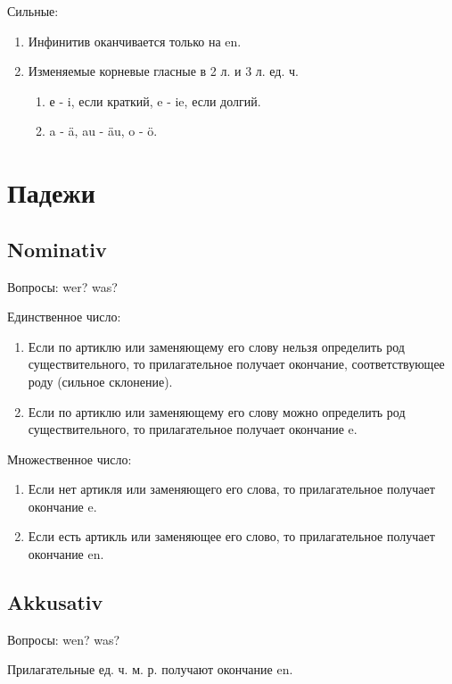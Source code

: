 \documentclass[oneside]{book}
\begin{document}
    Сильные:
    \begin{enumerate}
        \item Инфинитив оканчивается только на en.
        \item Изменяемые корневые гласные в 2 л. и 3 л. ед. ч.
        \begin{enumerate}
            \item е - i, если краткий, e - ie, если долгий.
            \item a - \"a, au - \"au, o - \"o.
        \end{enumerate}
    \end{enumerate}

    \chapter{Падежи}
    \section{Nominativ}
    Вопросы: wer? was?

    Единственное число:
    \begin{enumerate}
        \item Если по артиклю или заменяющему его слову нельзя определить род
        существительного, то прилагательное получает окончание, соответствующее
        роду (сильное склонение).

        \item Если по артиклю или заменяющему его слову можно определить
        род существительного, то прилагательное получает окончание e.
    \end{enumerate}

    Множественное число:
    \begin{enumerate}
        \item Если нет артикля или заменяющего его слова,
        то прилагательное получает окончание e.

        \item Если есть артикль или заменяющее его слово,
        то прилагательное получает окончание en.
    \end{enumerate}

    \section{Akkusativ}
    Вопросы: wen? was?

    Прилагательные ед. ч. м. р. получают окончание en.
\end{document}
